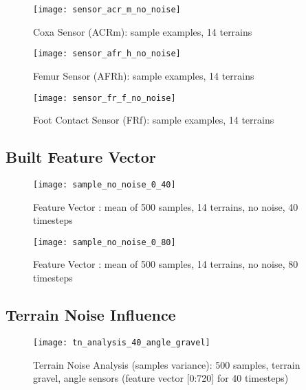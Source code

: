 \begin{figure}[H]
  \centering
  \texttt{[image: sensor\_acr\_m\_no\_noise]}
  \caption{Coxa Sensor (ACRm): sample examples, 14 terrains}
  \label{fig:sensor_acr_m_no_noise}
\end{figure}

\begin{figure}[H]
  \centering
  \texttt{[image: sensor\_afr\_h\_no\_noise]}
  \caption{Femur Sensor (AFRh): sample examples, 14 terrains}
  \label{fig:sensor_afr_h_no_noise}
\end{figure}

\begin{figure}[H]
  \centering
  \texttt{[image: sensor\_fr\_f\_no\_noise]}
  \caption{Foot Contact Sensor (FRf): sample examples, 14 terrains}
  \label{fig:sensor_fl_f_no_noise}
\end{figure}

\subsection{Built Feature Vector} \label{ssec:built_feature_vectors}

\begin{figure}[H]
  \centering
  \texttt{[image: sample\_no\_noise\_0\_40]}
  \caption{Feature Vector : mean of 500 samples, 14 terrains, no noise, 40 timesteps}
  \label{fig:sample_40t}
\end{figure}


\begin{figure}[H]
  \centering
  \texttt{[image: sample\_no\_noise\_0\_80]}
  \caption{Feature Vector : mean of 500 samples, 14 terrains, no noise, 80 timesteps}
  \label{fig:sample_80t}
\end{figure}

\subsection{Terrain Noise Influence} \label{ssec:terrain_noise_influence}

\begin{figure}[H]
  \centering
  \texttt{[image: tn\_analysis\_40\_angle\_gravel]}
  \caption{Terrain Noise Analysis (samples variance): 500 samples, terrain gravel, angle sensors (feature vector [0:720] for 40 timesteps)}
  \label{fig:tn_analysis_angle_gravel}
\end{figure}

